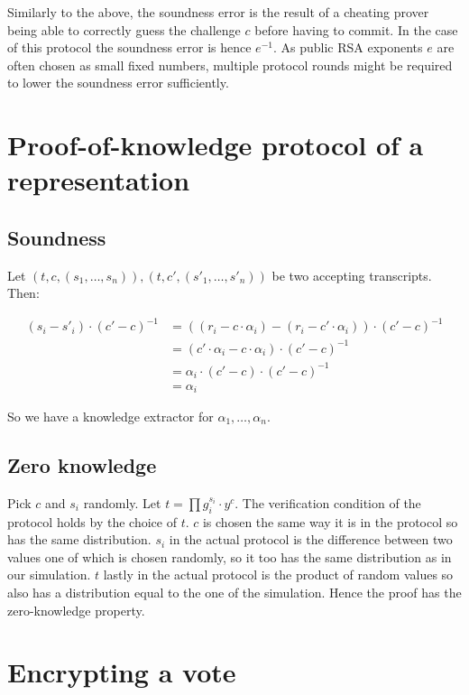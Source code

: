 \documentclass[a4paper]{scrreprt}
\begin{document}
Similarly to the above, the soundness error is the result of a cheating prover
being able to correctly guess the challenge $c$ before having to commit. In the
case of this protocol the soundness error is hence $e^{-1}$. As public RSA
exponents $e$ are often chosen as small fixed numbers, multiple protocol rounds
might be required to lower the soundness error sufficiently.

\section{Proof-of-knowledge protocol of a representation}

\subsection{Soundness}

Let $(t, c, (s_1, \ldots, s_n)), (t, c', (s'_1, \ldots, s'_n))$ be two accepting
transcripts. Then:

\begin{align*}
		(s_i - s'_i) \cdot (c' - c)^{-1} & = ((r_i - c \cdot \alpha_i) - (r_i - c' \cdot \alpha_i)) \cdot (c' - c)^{-1} \\
										 & = (c' \cdot \alpha_i - c \cdot \alpha_i) \cdot (c' - c)^{-1} \\
										 & = \alpha_i \cdot (c' - c) \cdot (c' - c)^{-1} \\
										 & = \alpha_i
\end{align*}

So we have a knowledge extractor for $\alpha_1, \ldots, \alpha_n$.

\subsection{Zero knowledge}

Pick $c$ and $s_i$ randomly. Let $t = \prod g_i^{s_i} \cdot y^c$. The
verification condition of the protocol holds by the choice of $t$. $c$ is
chosen the same way it is in the protocol so has the same distribution. $s_i$
in the actual protocol is the difference between two values one of which is
chosen randomly, so it too has the same distribution as in our simulation. $t$
lastly in the actual protocol is the product of random values so also has a
distribution equal to the one of the simulation. Hence the proof has the
zero-knowledge property.

\section{Encrypting a vote}
\end{document}
